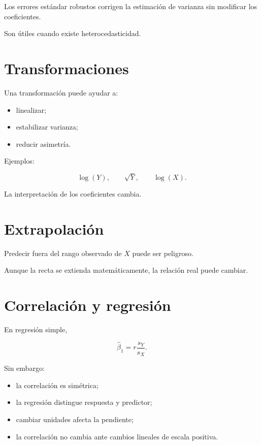 \documentclass[
  spanish,
  11pt,
  letterpaper,
  DIV=11,
  numbers=noendperiod]{scrreprt}
\providecommand{\tightlist}{%
  \setlength{\itemsep}{0pt}\setlength{\parskip}{0pt}}
\theoremstyle{definition}
\theoremstyle{plain}
\theoremstyle{definition}
\theoremstyle{remark}
\begin{document}
Los errores estándar robustos corrigen la estimación de varianza sin
modificar los coeficientes.

Son útiles cuando existe heterocedasticidad.

\section{Transformaciones}\label{transformaciones}

Una transformación puede ayudar a:

\begin{itemize}
\tightlist
\item
  linealizar;
\item
  estabilizar varianza;
\item
  reducir asimetría.
\end{itemize}

Ejemplos:

\[
\log(Y),
\qquad
\sqrt{Y},
\qquad
\log(X).
\]

La interpretación de los coeficientes cambia.

\section{Extrapolación}\label{extrapolaciuxf3n}

Predecir fuera del rango observado de \(X\) puede ser peligroso.

Aunque la recta se extienda matemáticamente, la relación real puede
cambiar.

\section{Correlación y regresión}\label{correlaciuxf3n-y-regresiuxf3n}

En regresión simple,

\[
\widehat{\beta}_1
=
r
\frac{s_Y}{s_X}.
\]

Sin embargo:

\begin{itemize}
\tightlist
\item
  la correlación es simétrica;
\item
  la regresión distingue respuesta y predictor;
\item
  cambiar unidades afecta la pendiente;
\item
  la correlación no cambia ante cambios lineales de escala positiva.
\end{itemize}
\end{document}
